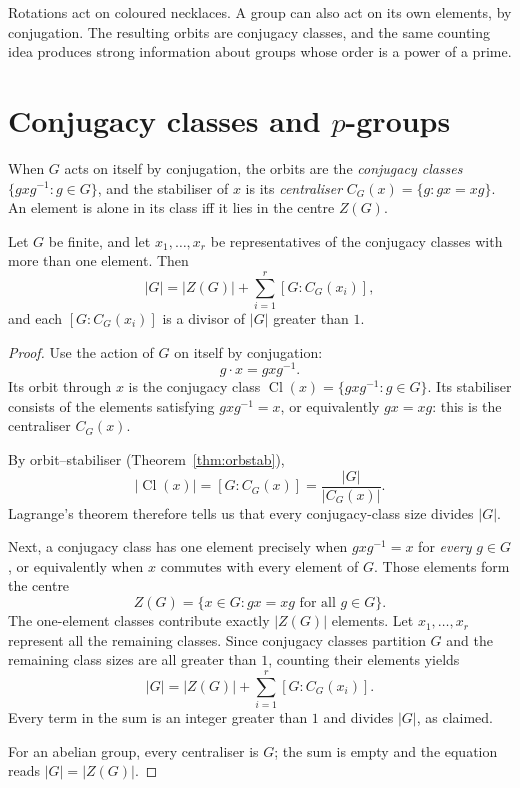Rotations act on coloured necklaces. A group can also act on its own elements, by conjugation. The resulting orbits are conjugacy classes, and the same counting idea produces strong information about groups whose order is a power of a prime.

\section{Conjugacy classes and \texorpdfstring{$p$}{p}-groups}

When $G$ acts on itself by conjugation, the orbits are the \emph{conjugacy classes} $\{gxg^{-1}:g\in G\}$, and the stabiliser of $x$ is its \emph{centraliser} $C_G(x)=\{g:gx=xg\}$. An element is alone in its class iff it lies in the centre $Z(G)$.

\begin{theorem}\label{thm:classeq}
Let $G$ be finite, and let $x_1,\dots,x_r$ be representatives of the conjugacy classes with more than one element. Then
\[
|G|=|Z(G)|+\sum_{i=1}^r[G:C_G(x_i)],
\]
and each $[G:C_G(x_i)]$ is a divisor of $|G|$ greater than $1$.
\end{theorem}
\begin{proof}
Use the action of $G$ on itself by conjugation:
\[
g\cdot x=gxg^{-1}.
\]
Its orbit through $x$ is the conjugacy class
$\operatorname{Cl}(x)=\{gxg^{-1}:g\in G\}$.
Its stabiliser consists of the elements satisfying
$gxg^{-1}=x$, or equivalently $gx=xg$:
this is the centraliser $C_G(x)$.

By orbit--stabiliser (Theorem~\ref{thm:orbstab}),
\[
|\operatorname{Cl}(x)|=[G:C_G(x)]
=\frac{|G|}{|C_G(x)|}.
\]
Lagrange's theorem therefore tells us that
every conjugacy-class size divides $|G|$.

Next, a conjugacy class has one element precisely when
$gxg^{-1}=x$ for \emph{every} $g\in G$, or
equivalently when $x$ commutes with every element
of $G$. Those elements form the centre
\[
Z(G)=\{x\in G:gx=xg\text{ for all }g\in G\}.
\]
The one-element classes contribute exactly $|Z(G)|$
elements. Let $x_1,\ldots,x_r$ represent all the
remaining classes. Since conjugacy classes partition
$G$ and the remaining class sizes are all greater
than $1$, counting their elements yields
\[
\boxed{|G|=|Z(G)|+\sum_{i=1}^r[G:C_G(x_i)]}.
\]
Every term in the sum is an integer greater than $1$
and divides $|G|$, as claimed.

For an abelian group, every centraliser is $G$;
the sum is empty and the equation reads $|G|=|Z(G)|$.
\end{proof}

